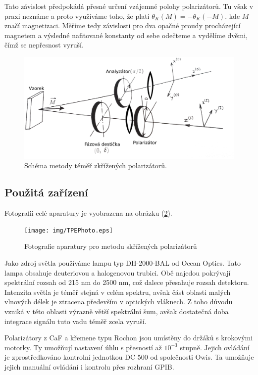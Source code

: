 Tato závislost předpokádá přesné určení vzájemné polohy polarizátorů. Tu však v praxi neznáme a proto využíváme toho, že platí $\theta_K(M)=-\theta_K(-M)$. kde $M$ značí magnetizaci. Měříme tedy závislosti pro dva opačné proudy procházející magnetem a výsledné nafitované konstanty od sebe odečteme a vydělíme dvěmi, čímž se nepřesnost vyruší.

\begin{figure}
    \includegraphics[width=5in]{img/TPEschema.eps}
    \caption{Schéma metody téměř zkřížených polarizátorů.}
    \label{Schema TPE}
\end{figure}

\subsection{Použitá zařízení}
Fotografii celé aparatury je vyobrazena na obrázku (\ref{TPE photo}).

\begin{figure}
\begin{center}
\texttt{[image: img/TPEPhoto.eps]}
\caption{Fotografie aparatury pro metodu skřížených polarizátorů}
\label{TPE photo}
\end{center}
\end{figure}

Jako zdroj světla používáme lampu typ DH-2000-BAL od Ocean Optics. Tato lampa obsahuje deuteriovou a halogenovou trubici. Obě najedou pokrývají spektrální rozsah od 215 nm do 2500 nm, což dalece přesahuje rozsah detektoru. Intenzita světla je téměř stejná v celém spektru, avšak část oblasti malých vlnových délek je ztracena především v optických vláknech. Z toho důvodu vzniká v této oblasti výrazně větší spektrální šum, avšak dostatečná doba integrace signálu tuto vadu téměř zcela vyruší.

Polarizátory z CaF a křemene typu Rochon jsou umístěny do držáků s krokovými motorky.  Ty umožňují nastavení úhlu s přesností až $10^{-3}$ stupně. Jejich ovládání je zprostředkováno kontrolní jednotkou DC 500 od společnosti Owis. Ta umožňuje jejich manuální ovládání i kontrolu přes rozhraní GPIB.

